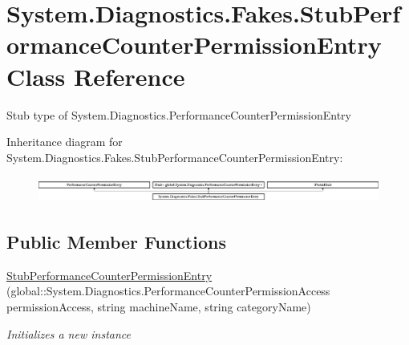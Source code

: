 \hypertarget{class_system_1_1_diagnostics_1_1_fakes_1_1_stub_performance_counter_permission_entry}{\section{System.\-Diagnostics.\-Fakes.\-Stub\-Performance\-Counter\-Permission\-Entry Class Reference}
\label{class_system_1_1_diagnostics_1_1_fakes_1_1_stub_performance_counter_permission_entry}
}


Stub type of System.\-Diagnostics.\-Performance\-Counter\-Permission\-Entry 


Inheritance diagram for System.\-Diagnostics.\-Fakes.\-Stub\-Performance\-Counter\-Permission\-Entry\-:\begin{figure}[H]
\begin{center}
\leavevmode
\includegraphics[height=0.864197cm]{class_system_1_1_diagnostics_1_1_fakes_1_1_stub_performance_counter_permission_entry}
\end{center}
\end{figure}
\subsection*{Public Member Functions}
\begin{DoxyCompactItemize}
\item 
\hyperlink{class_system_1_1_diagnostics_1_1_fakes_1_1_stub_performance_counter_permission_entry_aef159fac08b659ac0474c9cd139d9b18}{Stub\-Performance\-Counter\-Permission\-Entry} (global\-::\-System.\-Diagnostics.\-Performance\-Counter\-Permission\-Access permission\-Access, string machine\-Name, string category\-Name)
\begin{DoxyCompactList}\small\item\em Initializes a new instance\end{DoxyCompactList}\end{DoxyCompactItemize}
